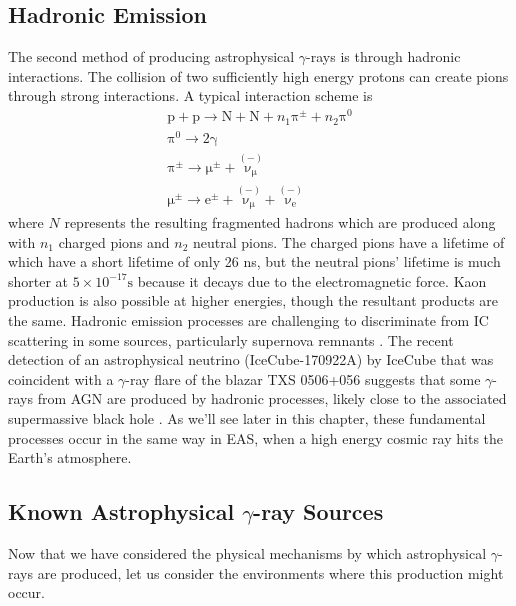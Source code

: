 \subsection{Hadronic Emission}
The second method of producing astrophysical $\gamma$-rays is through hadronic interactions. The collision of two sufficiently high energy protons can create pions through strong interactions.  A typical interaction scheme \cite{EAS} is
\begin{gather*}
\mathrm{p}+\mathrm{p}\rightarrow \mathrm{N}+\mathrm{N}+n_1 \mathrm{\pi^{\pm}}+n_2\mathrm{\pi^0} \\
\mathrm{\pi^0} \rightarrow \mathrm{2\gamma} \\
\mathrm{\mathrm{\pi^{\pm}}} \rightarrow \mathrm{\mu^{\pm}}+\mathrm{\overset{(-)}{\nu_{\mu}}}\\
\mathrm{\mu^{\pm}} \rightarrow \mathrm{e^{\pm}}+\mathrm{\overset{(-)}{\nu_{\mu}}}+\mathrm{\overset{(-)}{\nu_{e}}}
\end{gather*}
where $N$ represents the resulting fragmented hadrons which are produced along with $n_1$ charged pions and $n_2$ neutral pions. The charged pions have a lifetime of which have a short lifetime of only 26 ns, but the neutral pions' lifetime is much shorter at $5 \times 10^{-17} \mathrm{s}$ because it decays due to the electromagnetic force. Kaon production is also possible at higher energies, though the resultant products are the same. Hadronic emission processes are challenging to discriminate from IC scattering in some sources, particularly supernova remnants \cite{rxjcta}. The recent detection of an astrophysical neutrino (IceCube-170922A) by IceCube that was coincident with a $\gamma$-ray flare of the blazar TXS 0506+056 suggests that some $\gamma$-rays from AGN are produced by hadronic processes, likely close to the associated supermassive black hole \cite{TXS}. As we'll see later in this chapter, these fundamental processes occur in the same way in EAS, when a high energy cosmic ray hits the Earth's atmosphere.

\subsection{Known Astrophysical \ensuremath{\gamma}-ray Sources}

Now that we have considered the physical mechanisms by which astrophysical $\gamma$-rays are produced, let us consider the environments where this production might occur.


